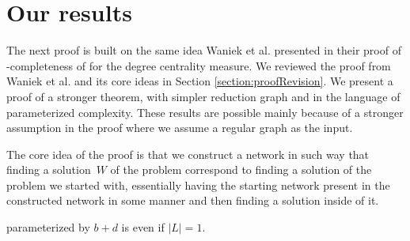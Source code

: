 \section{Our results}\label{section:OurResults}

The next proof is built on the same idea Waniek et al. \cite{Waniek2017} presented in their proof of
\NP-completeness of \HLshort for the degree centrality measure.
We reviewed the proof from Waniek et al. \cite{Waniek2017} and its core ideas in Section \ref{section:proofRevision}.
We present a proof of a stronger theorem, with simpler reduction graph and in the language of parameterized complexity.
These results are possible mainly because of a stronger assumption in the proof where we assume a regular graph as the input.

The core idea of the proof is that we construct a network in such way that finding a solution~$W$ of the \HL problem
correspond to finding a solution of the problem we started with, essentially having the starting network
present in the constructed network in some manner and then finding a solution inside of it.

\begin{theorem}\label{theorem:DB}
    \HL parameterized by $b + d$ is \Wh even if $|L| = 1$.
\end{theorem}

